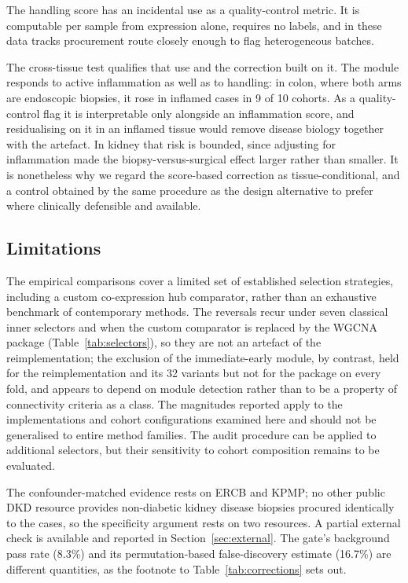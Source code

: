 \documentclass[pdflatex,sn-vancouver-num]{sn-jnl}
\theoremstyle{thmstyleone}
\theoremstyle{thmstyletwo}
\theoremstyle{thmstylethree}
\begin{document}
The handling score has an incidental use as a quality-control metric. It is computable per sample
from expression alone, requires no labels, and in these data tracks procurement route closely
enough to flag heterogeneous batches.

The cross-tissue test qualifies that use and the correction built on it. The module responds to
active inflammation as well as to handling: in colon, where both arms are endoscopic biopsies,
it rose in inflamed cases in 9 of 10 cohorts. As a quality-control flag it is interpretable only
alongside an inflammation score, and residualising on it in an inflamed tissue would remove
disease biology together with the artefact. In kidney that risk is bounded, since adjusting for
inflammation made the biopsy-versus-surgical effect larger rather than smaller. It is
nonetheless why we regard the score-based correction as tissue-conditional, and a control
obtained by the same procedure as the design alternative to prefer where clinically defensible and available.

\subsection{Limitations}\label{sec:limitations}

The empirical comparisons cover a limited set of established selection strategies,
including a custom co-expression hub comparator, rather than an exhaustive benchmark of
contemporary methods. The reversals recur under seven classical inner selectors and when the custom comparator is
replaced by the WGCNA package (Table~\ref{tab:selectors}), so they are not an artefact of the
reimplementation; the exclusion of the immediate-early module, by contrast, held for the
reimplementation and its 32 variants but not for the package on every fold, and appears to depend
on module detection rather than to be a property of connectivity criteria as a class. The magnitudes
reported apply to the implementations and cohort configurations examined here and should not be
generalised to entire method families. The audit procedure can be applied to additional selectors, but their sensitivity
to cohort composition remains to be evaluated.

The confounder-matched evidence rests on ERCB and KPMP; no other public DKD resource provides
non-diabetic kidney disease biopsies procured identically to the cases, so the specificity
argument rests on two resources. A partial external check is available and reported in
Section~\ref{sec:external}. The gate's background pass rate (8.3\%) and its permutation-based false-discovery estimate (16.7\%) are different quantities, as the footnote to Table~\ref{tab:corrections} sets out.
\end{document}
